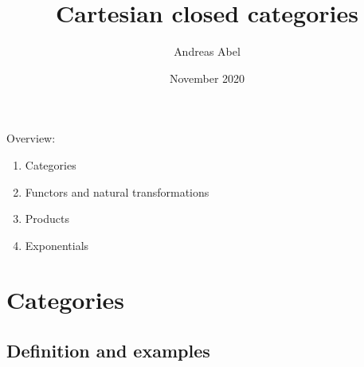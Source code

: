\documentclass[a4paper,fleqn]{scrartcl}
\title{Cartesian closed categories}
\author{Andreas Abel}
\date{November 2020%
     }
\theoremstyle{definition}
\begin{document}
\maketitle

Overview:
\begin{enumerate}
\item Categories
\item Functors and natural transformations
\item Products
\item Exponentials
\end{enumerate}

\section{Categories}
\label{sec:cat}

\subsection{Definition and examples}
\end{document}
